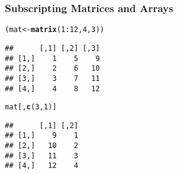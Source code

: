 \documentclass[paper=screen,mathserif]{beamer}\usepackage[]{graphicx}\usepackage[]{color}
\makeatletter
\newcommand{\hlnum}[1]{\textcolor[rgb]{0.686,0.059,0.569}{#1}}%
\newcommand{\hlopt}[1]{\textcolor[rgb]{0,0,0}{#1}}%
\newcommand{\hlstd}[1]{\textcolor[rgb]{0.345,0.345,0.345}{#1}}%
\newcommand{\hlkwb}[1]{\textcolor[rgb]{0.69,0.353,0.396}{#1}}%
\newcommand{\hlkwd}[1]{\textcolor[rgb]{0.737,0.353,0.396}{\textbf{#1}}}%
\newenvironment{kframe}{%
 \def\at@end@of@kframe{}%
 \ifinner\ifhmode%
  \def\at@end@of@kframe{\end{minipage}}%
  \begin{minipage}{\columnwidth}%
 \fi\fi%
 \def\FrameCommand##1{\hskip\@totalleftmargin \hskip-\fboxsep
 \colorbox{shadecolor}{##1}\hskip-\fboxsep
     \hskip-\linewidth \hskip-\@totalleftmargin \hskip\columnwidth}%
 \MakeFramed {\advance\hsize-\width
   \@totalleftmargin\z@ \linewidth\hsize
   \@setminipage}}%
 {\par\unskip\endMakeFramed%
 \at@end@of@kframe}
\newenvironment{knitrout}{}{} %
\newcommand{\ft}[1]{\frametitle{#1}}
\makeatother
\begin{document}
\begin{frame}[fragile]
\begin{itemize}
  \end{itemize}
  
\end{frame}

\begin{frame}[fragile]
  \ft{Subscripting Matrices and Arrays}
  
\begin{knitrout}\scriptsize
{}\color{fgcolor}\begin{kframe}
\begin{alltt}
\hlstd{(mat} \hlkwb{<-} \hlkwd{matrix}\hlstd{(}\hlnum{1}\hlopt{:}\hlnum{12}\hlstd{,} \hlnum{4}\hlstd{,} \hlnum{3}\hlstd{))}
\end{alltt}
\begin{verbatim}
##      [,1] [,2] [,3]
## [1,]    1    5    9
## [2,]    2    6   10
## [3,]    3    7   11
## [4,]    4    8   12
\end{verbatim}
\end{kframe}
\end{knitrout}

\begin{knitrout}\scriptsize
{}\color{fgcolor}\begin{kframe}
\begin{alltt}
\hlstd{mat[,} \hlkwd{c}\hlstd{(}\hlnum{3}\hlstd{,} \hlnum{1}\hlstd{)]}
\end{alltt}
\begin{verbatim}
##      [,1] [,2]
## [1,]    9    1
## [2,]   10    2
## [3,]   11    3
## [4,]   12    4
\end{verbatim}
\end{kframe}
\end{knitrout}

\end{frame}
\end{document}
